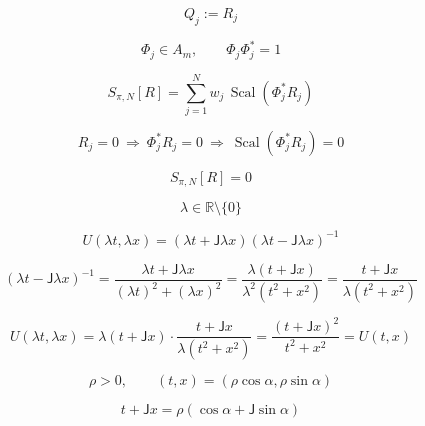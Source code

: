 \documentclass[12pt]{article}
\begin{document}
\begin{equation}
Q_j:=R_j
\end{equation}

\begin{equation}
\Phi_j\in A_m,\qquad \Phi_j\Phi_j^{*}=1
\end{equation}

\begin{equation}
S_{\pi,N}[R]=\sum_{j=1}^N w_j\,\operatorname{Scal}(\Phi_j^{*}R_j)
\end{equation}

\begin{equation}
R_j=0\ \Longrightarrow\ \Phi_j^{*}R_j=0\ \Longrightarrow\ \operatorname{Scal}(\Phi_j^{*}R_j)=0
\end{equation}

\begin{equation}
S_{\pi,N}[R]=0
\end{equation}

\begin{equation}
\lambda\in\mathbb{R}\setminus\{0\}
\end{equation}

\begin{equation}
U(\lambda t,\lambda x)=(\lambda t+\mathsf{J}\lambda x)(\lambda t-\mathsf{J}\lambda x)^{-1}
\end{equation}

\begin{equation}
(\lambda t-\mathsf{J}\lambda x)^{-1}=\frac{\lambda t+\mathsf{J}\lambda x}{(\lambda t)^2+(\lambda x)^2}=\frac{\lambda(t+\mathsf{J}x)}{\lambda^2(t^2+x^2)}=\frac{t+\mathsf{J}x}{\lambda(t^2+x^2)}
\end{equation}

\begin{equation}
U(\lambda t,\lambda x)=\lambda(t+\mathsf{J}x)\cdot\frac{t+\mathsf{J}x}{\lambda(t^2+x^2)}=\frac{(t+\mathsf{J}x)^2}{t^2+x^2}=U(t,x)
\end{equation}

\begin{equation}
\rho>0,\qquad (t,x)=(\rho\cos\alpha,\rho\sin\alpha)
\end{equation}

\begin{equation}
t+\mathsf{J}x=\rho(\cos\alpha+\mathsf{J}\sin\alpha)
\end{equation}

\end{document}
